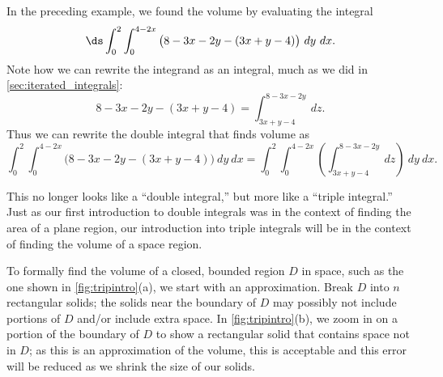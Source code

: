 In the preceding example, we found the volume by evaluating the integral $$\ds \int_0^2\int_0^{4-2x} \big(8-3x-2y-(3x+y-4)\big)\ dy\ dx.$$ Note how we can rewrite the integrand as an integral, much as we did in \autoref{sec:iterated_integrals}:
$$8-3x-2y-(3x+y-4) = \int_{3x+y-4}^{8-3x-2y}\ dz.$$
Thus we can rewrite the double integral that finds volume as
$$\int_0^2\int_0^{4-2x} \big(8-3x-2y-(3x+y-4)\big)\ dy\ dx = \int_0^2\int_0^{4-2x}\left(\int_{3x+y-4}^{8-3x-2y}\ dz\right)\ dy\ dx.$$

This no longer looks like a ``double integral,'' but more like a ``triple integral.'' Just as our first introduction to double integrals was in the context of finding the area of a plane region, our introduction into triple integrals will be in the context of finding the volume of a space region.

To formally find the volume of a closed, bounded region $D$ in space, such as the one shown in \autoref{fig:tripintro}(a), we start with an approximation. Break $D$ into $n$ rectangular solids; the solids near the boundary of $D$ may possibly not include portions of $D$ and/or include extra space. In \autoref{fig:tripintro}(b), we zoom in on a portion of the boundary of $D$ to show a rectangular solid that contains space not in $D$; as this is an approximation of the volume, this is acceptable and this error will be reduced as we shrink the size of our solids.

